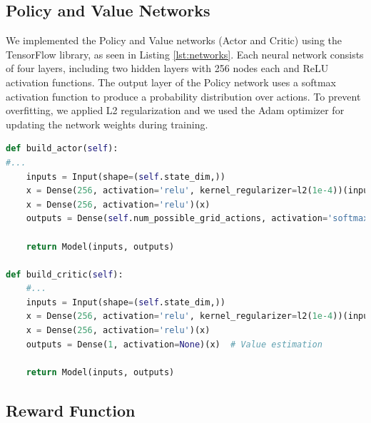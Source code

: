 \documentclass{article}
\begin{document}
\subsection{Policy and Value Networks}
We implemented the Policy and Value networks (Actor and Critic) using the TensorFlow library, as seen in Listing \ref{lst:networks}. Each neural network consists of four layers, including two hidden layers with 256 nodes each and ReLU activation functions. The output layer of the Policy network uses a softmax activation function to produce a probability distribution over actions. To prevent overfitting, we applied L2 regularization and we used the Adam optimizer for updating the network weights during training.
\\
\begin{lstlisting}[language=Python, caption={Actor and Critic Networks}, label={lst:networks}]
def build_actor(self):
#...
    inputs = Input(shape=(self.state_dim,))     
    x = Dense(256, activation='relu', kernel_regularizer=l2(1e-4))(inputs)  # for overfitting
    x = Dense(256, activation='relu')(x)
    outputs = Dense(self.num_possible_grid_actions, activation='softmax')(x) # Probabilities distribution

    return Model(inputs, outputs)

def build_critic(self):
    #...
    inputs = Input(shape=(self.state_dim,))
    x = Dense(256, activation='relu', kernel_regularizer=l2(1e-4))(inputs)
    x = Dense(256, activation='relu')(x)
    outputs = Dense(1, activation=None)(x)  # Value estimation

    return Model(inputs, outputs)
\end{lstlisting}


\subsection{Reward Function}
\end{document}
